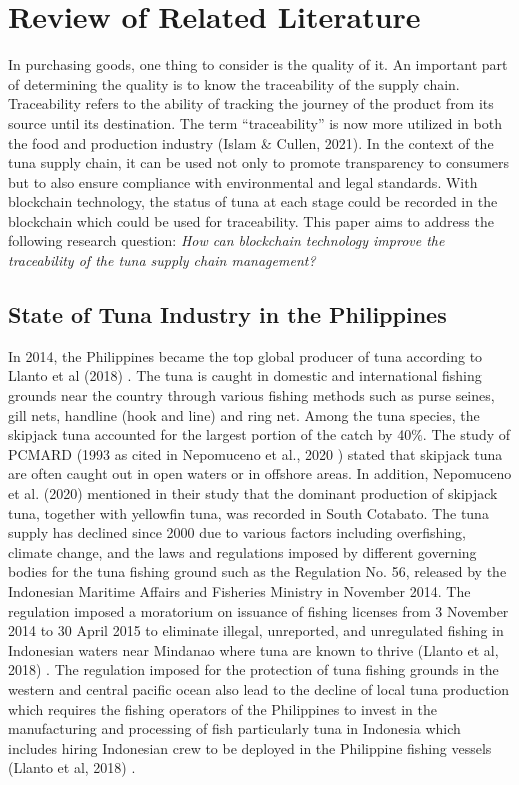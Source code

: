 \chapter{Review of Related Literature}
\label{sec:relatedlit}
In purchasing goods, one thing to consider is the quality of it. An important part of determining the quality is to know the traceability of the supply chain. Traceability refers to the ability of tracking the journey of the product from its source until its destination. The term “traceability” is now more utilized in both the food and production industry (Islam \& Cullen, 2021).  In the context of the tuna supply chain, it can be used not only to promote transparency to consumers but to also ensure compliance with environmental and legal standards. With blockchain technology, the status of tuna at each stage could be recorded in the blockchain which could be used for traceability. This paper aims to address the following research question: \textit{How can blockchain technology improve the traceability of the tuna supply chain management?}


\section{State of Tuna Industry in the Philippines}
In 2014, the Philippines became the top global producer of tuna according to Llanto et al (2018) \nocite{rrl-SoTIP1}. The tuna is caught in domestic and international fishing grounds near the country through various fishing methods such as purse seines, gill nets, handline (hook and line) and ring net. Among the tuna species, the skipjack tuna accounted for the largest portion of the catch by 40\%. The study of PCMARD (1993 as cited in Nepomuceno et al., 2020 ) \nocite{rrl-SoTIP2} stated that skipjack tuna are often caught out in open waters or in offshore areas. In addition, Nepomuceno et al. (2020) \nocite{rrl-SoTIP2} mentioned in their study that the dominant production of skipjack tuna, together with yellowfin tuna, was recorded in South Cotabato.
The tuna supply has declined since 2000 due to various factors including overfishing, climate change, and the laws and regulations imposed by different governing bodies for the tuna fishing ground such as the Regulation No. 56, released by the Indonesian Maritime Affairs and Fisheries Ministry in November 2014. The regulation imposed a moratorium on issuance of fishing licenses from 3 November 2014 to 30 April 2015 to eliminate illegal, unreported, and unregulated fishing in Indonesian waters near Mindanao where tuna are known to thrive (Llanto et al, 2018) \nocite{rrl-SoTIP1}. The regulation imposed for the protection of tuna fishing grounds in the western and central pacific ocean also lead to the decline of local tuna production which requires the  fishing operators of the Philippines to invest in the manufacturing and processing of fish particularly tuna in Indonesia which includes hiring Indonesian crew to be deployed in the Philippine fishing vessels (Llanto et al, 2018) \nocite{rrl-SoTIP1}.


